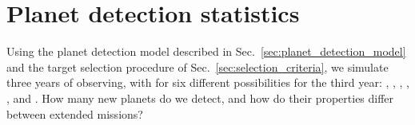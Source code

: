 \section{Planet detection statistics}  
\label{sec:newly_detected_planet_metrics}

Using the planet detection model described in Sec.~\ref{sec:planet_detection_model} and the target selection procedure of Sec.~\ref{sec:selection_criteria}, we simulate three years of \tess observing, with for six different possibilities for the third year:
\nhemi, \npole, \shemiAvoid, \elong, \eshort, and \hemis.
How many new planets do we detect, and how do their properties differ between extended missions?








